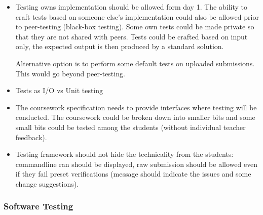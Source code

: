 \documentclass[sigplan,10pt,review]{acmart}\settopmatter{printfolios=true}
\begin{document}
\begin{itemize}

\item
Testing owns implementation should be allowed form day 1. The ability to craft tests based on someone else's implementation could also be allowed prior to peer-testing (black-box testing). Some own tests could be made private so that they are not shared with peers. Tests could be crafted based on input only, the expected output is then produced by a standard solution.

Alternative option is to perform some default tests on uploaded
submissions. This would go beyond peer-testing.



\item
  Tests as I/O vs Unit testing


  
\item

  The coursework specification needs to provide interfaces where
  testing will be conducted. The coursework could be broken down into
  smaller bits and some small bits could be tested among the students
  (without individual teacher feedback).


\item
  Testing framework should not hide the technicality from the
  students: commandline ran should be displayed, raw submission should
  be allowed even if they fail preset verifications (message should indicate the issues and some change suggestions).



\end{itemize}


\subsubsection{Software Testing}

\end{document}
